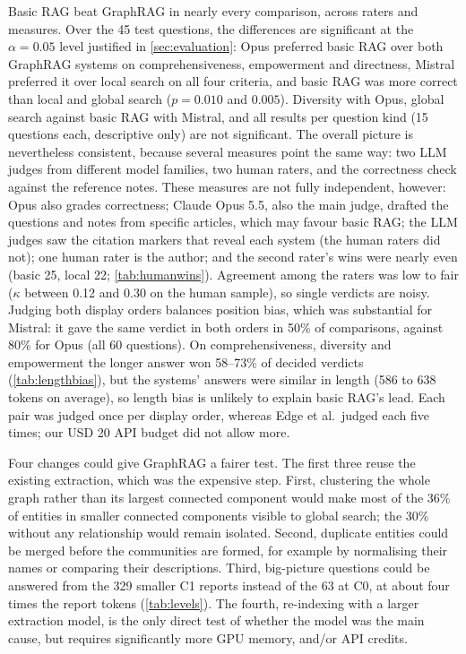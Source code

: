 \documentclass{article}
\begin{document}
Basic RAG beat GraphRAG in nearly every comparison, across raters and measures. Over the 45 test
questions, the differences are significant at the $\alpha = 0.05$ level justified in \cref{sec:evaluation}:
Opus preferred basic RAG over both GraphRAG systems on comprehensiveness, empowerment and directness,
Mistral preferred it over local search on all four criteria, and basic RAG was more correct than local
and global search ($p = 0.010$ and $0.005$). Diversity with Opus, global search against basic RAG with
Mistral, and all results per question kind (15 questions each, descriptive only) are not significant.
The overall picture is nevertheless consistent, because several measures point the same way: two LLM
judges from different model families, two human raters, and the correctness check against the reference
notes. These measures are not fully independent, however: Opus also grades correctness; Claude Opus 5.5, also the main judge, drafted the questions and notes from specific articles, which may favour basic RAG; the LLM judges saw the
citation markers that reveal each system (the human raters did not); one human rater is the author; and the second rater's wins were nearly even (basic 25, local 22; \cref{tab:humanwins}). Agreement among the raters was
low to fair ($\kappa$ between 0.12 and 0.30 on the human sample), so single verdicts are noisy.
Judging both display orders balances position bias, which was substantial for Mistral: it gave the same
verdict in both orders in 50\% of comparisons, against 80\% for Opus (all 60 questions). On
comprehensiveness, diversity and empowerment the longer answer won 58--73\% of decided verdicts
(\cref{tab:lengthbias}), but the systems' answers were similar in length (586 to 638 tokens on
average), so length bias is unlikely to explain basic RAG's lead. Each pair was judged once
per display order, whereas Edge et al.\ judged each five times; our USD 20 API budget
did not allow more.

Four changes could give GraphRAG a fairer test. The first three reuse the existing extraction, which was
the expensive step. First, clustering the whole graph rather than its largest connected component would
make most of the 36\% of entities in smaller connected components visible to global search; the 30\%
without any relationship would remain isolated. Second, duplicate entities could be merged before the
communities are formed, for example by normalising their names or comparing their descriptions. Third,
big-picture questions could be answered from the 329 smaller C1 reports instead of the 63 at C0, at
about four times the report tokens (\cref{tab:levels}). The fourth, re-indexing with a larger extraction model, is the only direct test of whether the model was
the main cause, but requires significantly more GPU memory, and/or API credits.
\end{document}
